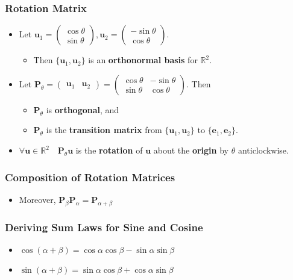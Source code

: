 \documentclass[../ma2001_notes.tex]{subfiles}
\begin{document}
\subsubsection{Rotation Matrix}
\begin{itemize}
	\item Let \(\bm{u}_1=\begin{pmatrix}
	\cos\theta \\ \sin\theta
\end{pmatrix},\bm{u}_2=\begin{pmatrix}
	-\sin\theta \\ \cos\theta
\end{pmatrix}\).
	\begin{itemize}
		\item Then \(\{\bm{u}_1,\bm{u}_2\}\) is an \textbf{orthonormal basis} for \(\mathbb{R}^2\).
	\end{itemize}
	\item Let \(\bm{P}_\theta=\begin{pmatrix}
		\bm{u}_1 & \bm{u}_2
	\end{pmatrix}=\begin{pmatrix}
		\cos\theta & -\sin\theta \\ \sin\theta & \cos\theta
	\end{pmatrix}\). Then
	\begin{itemize}
		\item\(\bm{P}_\theta\) is \textbf{orthogonal}, and
		\item\(\bm{P}_\theta\) is the \textbf{transition matrix} from \(\{\bm{u}_1,\bm{u}_2\}\) to \(\{\bm{e}_1,\bm{e}_2\}\).
	\end{itemize}
	\item\(\forall\bm{u}\in\mathbb{R}^2\quad\bm{P}_\theta\bm{u}\) is the \textbf{rotation} of \(\bm{u}\) about the \textbf{origin} by \(\theta\) anticlockwise.
\end{itemize}

\subsubsection{Composition of Rotation Matrices}
\begin{itemize}
	\item Moreover, \(\bm{P}_\beta\bm{P}_\alpha=\bm{P}_{\alpha+\beta}\)
\end{itemize}

\subsubsection{Deriving Sum Laws for Sine and Cosine}
\begin{itemize}
	\item\(\cos(\alpha+\beta)=\cos\alpha\cos\beta-\sin\alpha\sin\beta\)
	\item\(\sin(\alpha+\beta)=\sin\alpha\cos\beta+\cos\alpha\sin\beta\)
\end{itemize}
\end{document}
